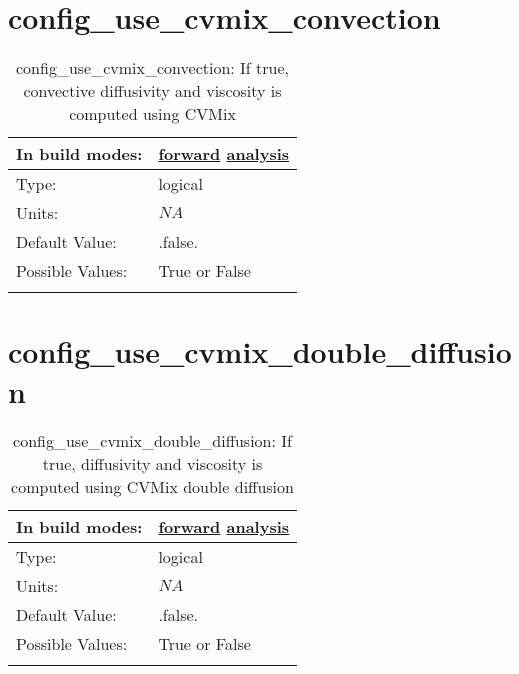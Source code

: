 \section[config\_use\_cvmix\_convection]{config\_use\_cvmix\_convection}
\label{sec:nm_sec_config_use_cvmix_convection}
\begin{center}
\begin{longtable}{| p{2.0in} || p{4.0in} |}
    \hline
    In build modes: & \hyperref[subsec:forward_nm_tab_cvmix]{forward} \hyperref[subsec:analysis_nm_tab_cvmix]{analysis} \\
    \hline
    Type: & logical \\
    \hline
    Units: & $NA$ \\
    \hline
    Default Value: & .false. \\
    \hline
    Possible Values: & True or False \\
    \hline
    \caption{config\_use\_cvmix\_convection: If true, convective diffusivity and viscosity is computed using CVMix}
\end{longtable}
\end{center}
\section[config\_use\_cvmix\_double\_diffusion]{config\_use\_cvmix\_double\_diffusion}
\label{sec:nm_sec_config_use_cvmix_double_diffusion}
\begin{center}
\begin{longtable}{| p{2.0in} || p{4.0in} |}
    \hline
    In build modes: & \hyperref[subsec:forward_nm_tab_cvmix]{forward} \hyperref[subsec:analysis_nm_tab_cvmix]{analysis} \\
    \hline
    Type: & logical \\
    \hline
    Units: & $NA$ \\
    \hline
    Default Value: & .false. \\
    \hline
    Possible Values: & True or False \\
    \hline
    \caption{config\_use\_cvmix\_double\_diffusion: If true, diffusivity and viscosity is computed using CVMix double diffusion}
\end{longtable}
\end{center}
